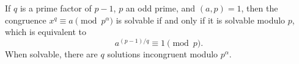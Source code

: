 If $q$ is a prime factor of $p-1$, $p$ an odd prime, and $(a, p) = 1$, then the congruence $x^q \equiv a \pmod{p^\alpha}$ is solvable if and only if it is solvable modulo $p$, which is equivalent to
$$a^{(p-1)/q} \equiv 1 \pmod{p}.$$
When solvable, there are $q$ solutions incongruent modulo $p^\alpha$.
